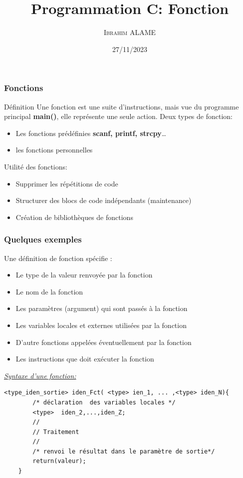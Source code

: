 \documentclass{beamer}
\title{Programmation C: Fonction}
\author{ \textsc{Ibrahim ALAME}}\institute{ESIEE}
\date{27/11/2023}
\begin{document}
\maketitle
 \begin{frame}
  \frametitle{Fonctions}
  \begin{block}{Définition}
 Une fonction est une suite d'instructions, mais vue du programme principal {\bf main()}, elle représente une seule action.
Deux types de fonction:
\begin{itemize}
\item Les fonctions prédéfinies  {\bf scanf, printf, strcpy}…
\item les fonctions personnelles
\end{itemize}
\end{block}

Utilité des fonctions:
\begin{itemize}
\item Supprimer les répétitions de code
\item Structurer des blocs de code indépendants (maintenance)
\item Création de bibliothèques de fonctions
\end{itemize}

  \end{frame}
  
\begin{frame}[fragile]
\frametitle{Quelques exemples}
Une définition de fonction spécifie :
\begin{itemize}
\item Le type de la valeur renvoyée par la fonction
\item Le nom de la fonction
\item Les paramètres (argument) qui sont passés à la fonction
\item Les variables locales et externes utilisées par la fonction
\item D'autre fonctions appelées éventuellement par la fonction
\item Les instructions que doit exécuter la fonction
\end{itemize}

\underline {\em Syntaxe d'une fonction:}

\begin{verbatim}
<type_iden_sortie> iden_Fct( <type> ien_1, ... ,<type> iden_N){
        /* déclaration  des variables locales */
        <type>  iden_2,...,iden_Z;
        //
        // Traitement 
        //
        /* renvoi le résultat dans le paramètre de sortie*/
        return(valeur);
    }

\end{verbatim}

\end{frame}
  
\end{document}
